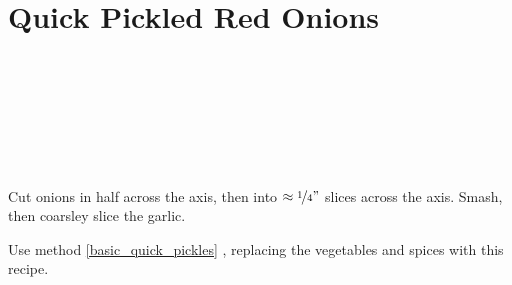 \section[Pickled Red Onions]{Quick Pickled Red Onions}\label{pickled_red_onions}

\begin{ingredientcolumns}[1]
	\begin{ingredientblock}
		\\
		\\
		\\
		\\
		\\
		\\
	\end{ingredientblock}
\end{ingredientcolumns}


\begin{preparation}
\item Cut onions in half across the axis, then into $\approx\nicefrac{1}{4} "$ slices across the axis.
	Smash, then coarsley slice the garlic.

\item Use method \ref{basic_quick_pickles} , replacing the vegetables and spices with this recipe.
\end{preparation}


\recipeend
